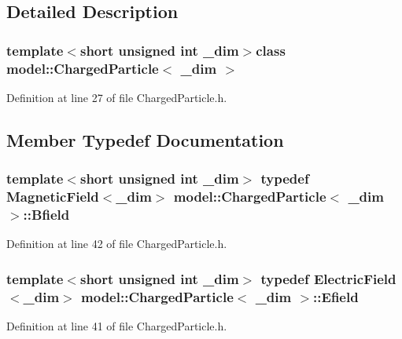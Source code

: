 \subsection{Detailed Description}
\subsubsection*{template$<$short unsigned int \+\_\+dim$>$class model\+::\+Charged\+Particle$<$ \+\_\+dim $>$}



Definition at line 27 of file Charged\+Particle.\+h.



\subsection{Member Typedef Documentation}
\hypertarget{classmodel_1_1_charged_particle_ae20fd0eb3401c71ca0f4e48b89aae709}{}
\subsubsection[{Bfield}]{\setlength{\rightskip}{0pt plus 5cm}template$<$short unsigned int \+\_\+dim$>$ typedef {\bf Magnetic\+Field}$<$\+\_\+dim$>$ {\bf model\+::\+Charged\+Particle}$<$ \+\_\+dim $>$\+::{\bf Bfield}}\label{classmodel_1_1_charged_particle_ae20fd0eb3401c71ca0f4e48b89aae709}


Definition at line 42 of file Charged\+Particle.\+h.

\hypertarget{classmodel_1_1_charged_particle_a2b7dfa8b171bbc5d473730136c484161}{}
\subsubsection[{Efield}]{\setlength{\rightskip}{0pt plus 5cm}template$<$short unsigned int \+\_\+dim$>$ typedef {\bf Electric\+Field}$<$\+\_\+dim$>$ {\bf model\+::\+Charged\+Particle}$<$ \+\_\+dim $>$\+::{\bf Efield}}\label{classmodel_1_1_charged_particle_a2b7dfa8b171bbc5d473730136c484161}


Definition at line 41 of file Charged\+Particle.\+h.

\hypertarget{classmodel_1_1_charged_particle_a0a40d2605cb1ace9a6277c5b61cb5733}{}
